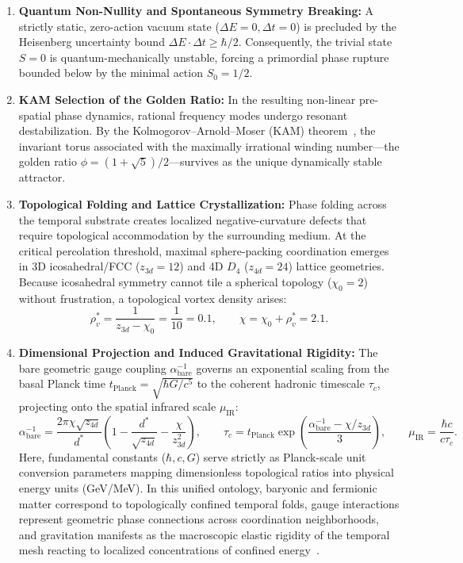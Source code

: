 \documentclass[11pt,a4paper]{article}
\begin{document}
\begin{enumerate}
    \item \textbf{Quantum Non-Nullity and Spontaneous Symmetry Breaking:} A strictly static, zero-action vacuum state ($\Delta E = 0, \Delta t = 0$) is precluded by the Heisenberg uncertainty bound $\Delta E \cdot \Delta t \ge \hbar/2$. Consequently, the trivial state $S = 0$ is quantum-mechanically unstable, forcing a primordial phase rupture bounded below by the minimal action $S_0 = 1/2$.
    
    \item \textbf{KAM Selection of the Golden Ratio:} In the resulting non-linear pre-spatial phase dynamics, rational frequency modes undergo resonant destabilization. By the Kolmogorov--Arnold--Moser (KAM) theorem~\cite{Kolmogorov1954,Moser1962,Arnold1963}, the invariant torus associated with the maximally irrational winding number—the golden ratio $\phi = (1 + \sqrt{5})/2$—survives as the unique dynamically stable attractor.
    
    \item \textbf{Topological Folding and Lattice Crystallization:} Phase folding across the temporal substrate creates localized negative-curvature defects that require topological accommodation by the surrounding medium. At the critical percolation threshold, maximal sphere-packing coordination emerges in 3D icosahedral/FCC ($z_{3d} = 12$) and 4D $D_4$ ($z_{4d} = 24$) lattice geometries. Because icosahedral symmetry cannot tile a spherical topology ($\chi_0 = 2$) without frustration, a topological vortex density arises:
    \begin{equation}
        \rho_v^* = \frac{1}{z_{3d} - \chi_0} = \frac{1}{10} = 0.1, \qquad \chi = \chi_0 + \rho_v^* = 2.1.
    \end{equation}
    
    \item \textbf{Dimensional Projection and Induced Gravitational Rigidity:} The bare geometric gauge coupling $\alpha_{\text{bare}}^{-1}$ governs an exponential scaling from the basal Planck time $t_{\text{Planck}} = \sqrt{\hbar G / c^5}$ to the coherent hadronic timescale $\tau_c$, projecting onto the spatial infrared scale $\mu_{\text{IR}}$:
    \begin{equation}
        \alpha_{\text{bare}}^{-1} = \frac{2\pi\chi\sqrt{z_{4d}}}{d^*} \left( 1 - \frac{d^*}{\sqrt{z_{4d}}} - \frac{\chi}{z_{3d}^2} \right), \qquad \tau_c = t_{\text{Planck}} \exp\left( \frac{\alpha_{\text{bare}}^{-1} - \chi/z_{3d}}{3} \right), \qquad \mu_{\text{IR}} = \frac{\hbar c}{c\tau_c}.
    \end{equation}
    Here, fundamental constants ($\hbar, c, G$) serve strictly as Planck-scale unit conversion parameters mapping dimensionless topological ratios into physical energy units (GeV/MeV). In this unified ontology, baryonic and fermionic matter correspond to topologically confined temporal folds, gauge interactions represent geometric phase connections across coordination neighborhoods, and gravitation manifests as the macroscopic elastic rigidity of the temporal mesh reacting to localized concentrations of confined energy~\cite{Sakharov1967}.
    

\end{enumerate}
\end{document}
